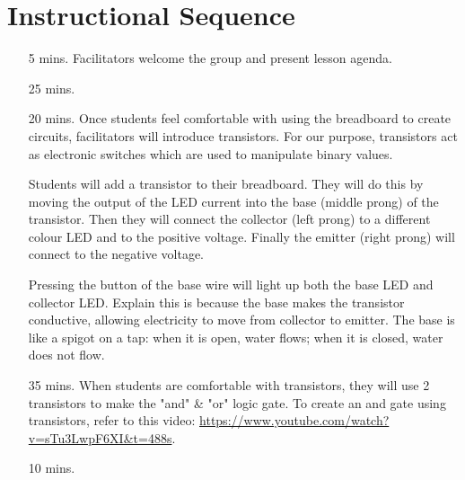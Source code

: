 \documentclass[11pt]{article}
\begin{document}
\section*{Instructional Sequence}

\begin{itemize}
  \item[5 mins.]
    Facilitators welcome the group and present lesson agenda.

  \item[25 mins.]

  \item[20 mins.]
    Once students feel comfortable with using the breadboard to create
    circuits, facilitators will introduce transistors. For our purpose,
    transistors act as electronic switches which are used to manipulate binary
    values.

    Students will add a transistor to their breadboard. They will do this by
    moving the output of the LED current into the base (middle prong) of the
    transistor. Then they will connect the collector (left prong) to a
    different colour LED and to the positive voltage. Finally the emitter
    (right prong) will connect to the negative voltage.

    Pressing the button of the base wire will light up both the base LED and
    collector LED. Explain this is because the base makes the transistor
    conductive, allowing electricity to move from collector to emitter. The
    base is like a spigot on a tap: when it is open, water flows; when it is
    closed, water does not flow.

  \item[35 mins.]
    When students are comfortable with transistors, they will use 2 transistors
    to make the "and" \& "or" logic gate. To create an and gate using
    transistors, refer to this video:
    \url{https://www.youtube.com/watch?v=sTu3LwpF6XI&t=488s}.

  \item[10 mins.]
\end{itemize}
\end{document}
